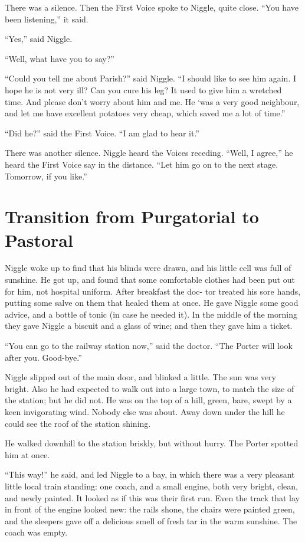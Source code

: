 \documentclass[english]{scrartcl}
\begin{document}
There was a silence. Then the First Voice spoke to Niggle, quite close. “You have been listening,” it said.

“Yes,” said Niggle.

“Well, what have you to say?”

“Could you tell me about Parish?” said Niggle. “I should like to see him again. I hope he is not very ill? Can you cure his leg? It used to give him a wretched time. And please don’t worry about him and me. He ‘was a very good neighbour, and let me have excellent potatoes very cheap, which saved me a lot of time.”

“Did he?” said the First Voice. “I am glad to hear it.”

There was another silence. Niggle heard the Voices receding. “Well, I agree,” he heard the First Voice say in the distance. “Let him go on to the next stage. Tomorrow, if you like.”

\section*{Transition from Purgatorial to Pastoral}

Niggle woke up to find that his blinds were drawn, and his little cell was full of sunshine. He got up, and found that some comfortable clothes had been put out for him, not hospital uniform. After breakfast the doc- tor treated his sore hands, putting some salve on them that healed them at once. He gave Niggle some good advice, and a bottle of tonic (in case he needed it). In the middle of the morning they gave Niggle a biscuit and a glass of wine; and then they gave him a ticket.

“You can go to the railway station now,” said the doctor. “The Porter will look after you. Good-bye.”

Niggle slipped out of the main door, and blinked a little. The sun was very bright. Also he had expected to walk out into a large town, to match the size of the station; but he did not. He was on the top of a hill, green, bare, swept by a keen invigorating wind. Nobody else was about. Away down under the hill he could see the roof of the station shining.

He walked downhill to the station briskly, but without hurry. The Porter spotted him at once.

“This way!” he said, and led Niggle to a bay, in which there was a very pleasant little local train standing: one coach, and a small engine, both very bright, clean, and newly painted. It looked as if this was their first run. Even the track that lay in front of the engine looked new: the rails shone, the chairs were painted green, and the sleepers gave off a delicious smell of fresh tar in the warm sunshine. The coach was empty.
\end{document}
